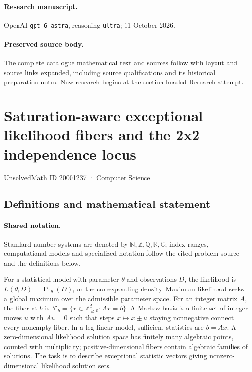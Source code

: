 \documentclass[11pt]{article}
\begin{document}
\paragraph{Research manuscript.} OpenAI \texttt{gpt-6-astra}, reasoning \texttt{ultra}; 11 October 2026.
\paragraph{Preserved source body.} The complete catalogue mathematical text and sources follow with layout and source links expanded, including source qualifications and its historical preparation notes. New research begins at the section headed Research attempt.

\section{Saturation-aware exceptional likelihood fibers and the 2x2 independence locus}\label{20001237}
{\small UnsolvedMath ID 20001237 · Computer Science}
\subsection{Definitions and mathematical statement}

\paragraph{Shared notation.}Standard number systems are denoted by $\mathbb N,\mathbb Z,\mathbb Q,\mathbb R,\mathbb C$; index ranges, computational models and specialized notation follow the cited problem source and the definitions below.


For a statistical model with parameter $\theta$ and observations $D$, the likelihood is $L(\theta;D)=\Pr_\theta(D)$, or the corresponding density. Maximum likelihood seeks a global maximum over the admissible parameter space. For an integer matrix $A$, the fiber at $b$ is $\mathcal F_b=\{x\in\mathbb Z_{\ge0}^d:Ax=b\}$. A Markov basis is a finite set of integer moves $u$ with $Au=0$ such that steps $x\mapsto x\pm u$ staying nonnegative connect every nonempty fiber. In a log-linear model, sufficient statistics are $b=Ax$. A zero-dimensional likelihood solution space has finitely many algebraic points, counted with multiplicity; positive-dimensional fibers contain algebraic families of solutions. The task is to describe exceptional statistic vectors giving nonzero-dimensional likelihood solution sets.
\end{document}
